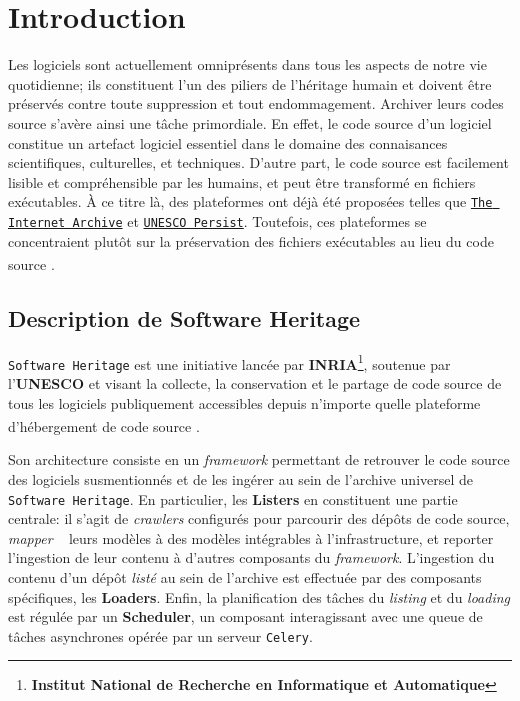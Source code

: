\documentclass[12pt,a4paper]{report}
\begin{document}
\chapter{Introduction}
Les logiciels sont actuellement omniprésents dans tous les aspects de notre vie quotidienne; ils constituent l'un des piliers de l'héritage humain et doivent être préservés contre toute suppression et tout endommagement. Archiver leurs codes source s'avère ainsi une tâche primordiale. En effet, le code source d’un logiciel constitue un artefact logiciel essentiel dans le domaine des connaisances scientifiques, culturelles, et techniques. D’autre part, le code source est facilement lisible et compréhensible par les humains, et peut être transformé en fichiers exécutables. À ce titre là, des plateformes ont déjà été proposées telles que \href{https://archive.org/}{\texttt{The Internet Archive}} et \href{https://unescopersist.org/}{\texttt{UNESCO Persist}}. Toutefois, ces plateformes se concentraient plutôt sur la préservation des fichiers exécutables au lieu du code source \textsuperscript{\textcolor{MidnightBlue}{\citep{internetArchive}}}\textsuperscript{\textcolor{MidnightBlue}{\citep{unescoPersist}}}.

\section{Description de Software Heritage}
\texttt{Software Heritage} est une initiative lancée par \textbf{INRIA}\textcolor{RoyalBlue}{\footnote{\textbf{Institut National de Recherche en Informatique et Automatique}}}, soutenue par l'\textbf{UNESCO} et visant \og la collecte, la conservation et le partage de code source de tous les logiciels publiquement accessibles depuis n'importe quelle plateforme d'hébergement de code source \fg \textsuperscript{\textcolor{MidnightBlue}{\citep{dicosmo}}}.

Son architecture consiste en un \textit{framework} permettant de retrouver le code source des logiciels susmentionnés et de les ingérer au sein de l’archive universel de \texttt{Software Heritage}. En particulier, les \textbf{Listers} en constituent une partie centrale: il s’agit de \textit{crawlers} configurés pour parcourir des dépôts de code source, \og \textit{mapper} \fg~ leurs modèles à des modèles intégrables à l'infrastructure, et reporter l'ingestion de leur contenu à d’autres composants du \textit{framework}. L'ingestion du contenu d'un dépôt \og \textit{listé} \fg au sein de l'archive est effectuée par des composants spécifiques, les \textbf{Loaders}. Enfin, la planification des tâches du \textit{listing} et du \textit{loading} est régulée par un \textbf{Scheduler}, un composant interagissant avec une queue de tâches asynchrones opérée par un serveur \texttt{Celery}.
\end{document}
